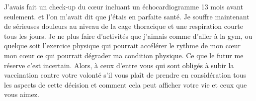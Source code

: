 {J’avais fait un check-up du cœur incluant un échocardiogramme 13 mois avant
seulement. et l’on m’avait dit que j’étais en parfaite santé. Je souffre
maintenant de sérieuses douleurs au niveau de la cage thoracique et une
respiration courte tous les jours. Je ne plus faire d’activités que j’aimais
comme d’aller à la gym, ou quelque soit l’exercice physique qui pourrait
accélérer le rythme de mon cœur mon cœur ce qui pourrait dégrader ma condition
physique. Ce que le futur me réserve c’est incertain. Alors, à ceux d’entre vous
qui sont obligés à subir la vaccination contre votre volonté s’il vous plaît de
prendre en considération tous les aspects de cette décision et comment cela peut
afficher votre vie et ceux que vous aimez.

}

